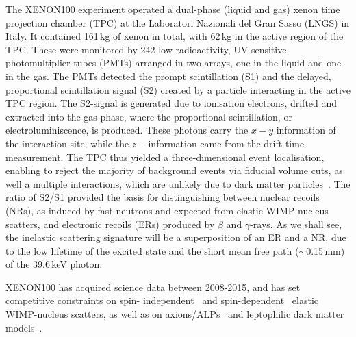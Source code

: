 The XENON100 experiment operated a dual-phase (liquid and gas) xenon time projection chamber (TPC) at the Laboratori Nazionali 
del Gran Sasso (LNGS) in Italy. It contained 161\,kg of xenon in total,  with  62\,kg in the active region of the TPC. These 
were monitored by 242 low-radioactivity, UV-sensitive photomultiplier tubes (PMTs) arranged in two arrays, one in the liquid 
and one in the gas. The PMTs detected the prompt scintillation (S1) and the delayed, proportional scintillation signal (S2) 
created by a particle interacting in the active TPC region. The S2-signal is generated due to ionisation electrons, drifted 
and extracted into the gas phase, where the proportional scintillation, or electroluminiscence, is produced. These photons 
carry the $x-y$ information of the interaction site, while the $z-$information came from the drift time measurement. The TPC 
thus yielded a three-dimensional event localisation, enabling to reject the majority of background events via fiducial volume 
cuts, as well a multiple interactions, which are unlikely due to dark matter particles~\cite{Aprile:2011dd}. The ratio of 
S2/S1 provided the basis for distinguishing between nuclear recoils (NRs), as induced by fast neutrons and expected from 
elastic WIMP-nucleus scatters, and electronic recoils (ERs) produced by $\beta$ and $\gamma$-rays. As we shall see, the 
inelastic scattering signature will be a superposition of an ER and a NR, due to the low lifetime of the excited state and 
the short mean free path ($\sim$0.15\,mm) of the 39.6\,keV photon. 

XENON100 has acquired science data between 2008-2015, and has set competitive constraints on spin-
independent~\cite{Aprile:2012nq,Aprile:2016swn} and spin-dependent~\cite{Aprile:2013doa,Aprile:2016swn} elastic WIMP-nucleus 
scatters, as well as on axions/ALPs~\cite{Aprile:2014eoa} and leptophilic dark matter 
models~\cite{Aprile:2015ade,Aprile:2015ibr,Aprile:2017yea}.
